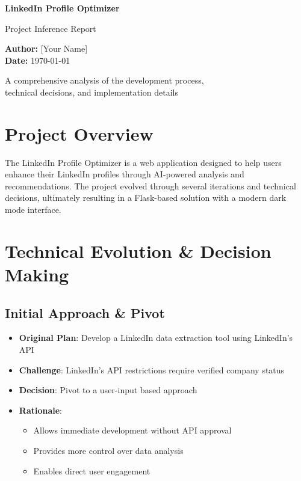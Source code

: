 \documentclass[12pt,a4paper]{article}
\begin{document}
\begin{titlepage}
    \begin{center}
        \vspace*{2cm}
        
        \Huge
        \textbf{LinkedIn Profile Optimizer}
        
        \vspace{1.5cm}
        
        \Large
        Project Inference Report
        
        \vspace{2cm}
        
        \large
        \textbf{Author:} [Your Name]\\
        \textbf{Date:} \today
        
        \vfill
        
        \large
        A comprehensive analysis of the development process,\\
        technical decisions, and implementation details
        
    \end{center}
\end{titlepage}

\tableofcontents
\newpage

\section{Project Overview}
The LinkedIn Profile Optimizer is a web application designed to help users enhance their LinkedIn profiles through AI-powered analysis and recommendations. The project evolved through several iterations and technical decisions, ultimately resulting in a Flask-based solution with a modern dark mode interface.

\section{Technical Evolution \& Decision Making}

\subsection{Initial Approach \& Pivot}
\begin{itemize}
    \item \textbf{Original Plan}: Develop a LinkedIn data extraction tool using LinkedIn's API
    \item \textbf{Challenge}: LinkedIn's API restrictions require verified company status
    \item \textbf{Decision}: Pivot to a user-input based approach
    \item \textbf{Rationale}:
    \begin{itemize}
        \item Allows immediate development without API approval
        \item Provides more control over data analysis
        \item Enables direct user engagement
    \end{itemize}
\end{itemize}
\end{document}

